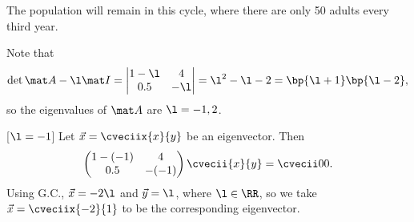 \begin{solution}
\begin{ppart}
\begin{psubpart}
        \end{psubpart}
        \begin{psubpart}
            The population will remain in this cycle, where there are only 50 adults every third year.
        \end{psubpart}
    \end{ppart}
    \begin{ppart}
        \begin{psubpart}
            Note that \[\det{\mat A - \l \mat I} = \begin{vmatrix}1 - \l & 4 \\ 0.5 & -\l\end{vmatrix} = \l^2 - \l - 2 = \bp{\l + 1}\bp{\l - 2},\] so the eigenvalues of $\mat A$ are $\l = -1, 2$.

            [$\l = -1$] Let $\vec x = \cveciix{x}{y}$ be an eigenvector. Then \[\begin{pmatrix}1-(-1) & 4 \\ 0.5 & -(-1)\end{pmatrix} \cvecii{x}{y} = \cvecii00.\] Using G.C., $\vec x = -2\l$ and $\vec y = \l$, where $\l \in \RR$, so we take $\vec x = \cveciix{-2}{1}$ to be the corresponding eigenvector.


\end{psubpart}
\end{ppart}
\end{solution}
